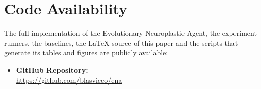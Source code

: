 \section*{Code Availability}

The full implementation of the Evolutionary Neuroplastic Agent, the experiment runners, the baselines, the LaTeX source of this paper and the scripts that generate its tables and figures are publicly available:
\begin{itemize}
    \item \textbf{GitHub Repository:}\\ \url{https://github.com/blasvicco/ena}
\end{itemize}
